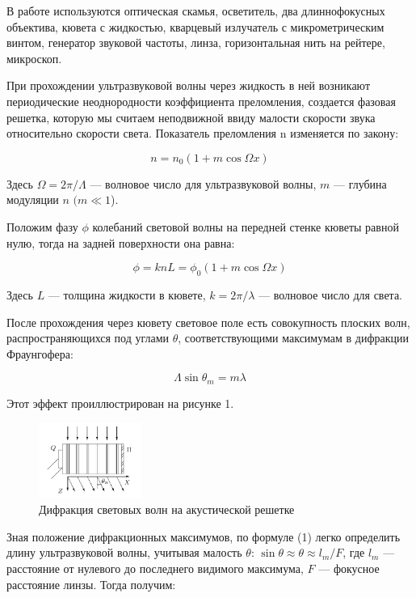 \documentclass[12pt]{kiarticle}
\begin{document}
	В работе используются оптическая скамья, осветитель, два длиннофокусных объектива, кювета с жидкостью, кварцевый излучатель с микрометрическим винтом, генератор звуковой частоты, линза, горизонтальная нить на рейтере, микроскоп. 
	
	При прохождении ультразвуковой волны через жидкость в ней возникают периодические неоднородности коэффициента преломления, создается фазовая решетка, которую мы считаем неподвижной ввиду малости скорости звука относительно скорости света. Показатель
	преломления n изменяется по закону:
	
	\begin{equation}\label{}
	n = n_0 (1 + m \cos \Omega x)
	\end{equation}
	
	Здесь $ \Omega = 2 \pi / \Lambda $ --- волновое число для ультразвуковой волны, $ m $ --- глубина модуляции $ n $ $ (m \ll 1 $).
	
	Положим фазу $ \phi $ колебаний световой волны на передней стенке кюветы равной нулю, тогда на задней поверхности она равна:
	
	\begin{equation}\label{}
	\phi  = k n L = \phi_0 (1 + m \cos \Omega x)
	\end{equation}
	
	Здесь $ L $ --- толщина жидкости в кювете, $ k = 2 \pi / \lambda $ --- волновое число для света.
	
	После прохождения через кювету световое поле есть совокупность плоских волн, распространяющихся под углами $ \theta $, соответствующими максимумам в дифракции Фраунгофера:
	
\begin{equation}\label{}	
	\Lambda \sin \theta_m = m \lambda
\end{equation}

	Этот эффект проиллюстрирован на рисунке 1.
	\begin{figure}[h!]
		\centering	
		\includegraphics[width=0.3\textwidth]{difraction.png}
		\caption{Дифракция световых волн на акустической решетке}
		\label{diff}
	\end{figure}

	Зная положение дифракционных максимумов, по формуле (1) легко определить длину ультразвуковой волны, учитывая малость $ \theta $: $ \sin \theta \approx \theta \approx l_m /F  $, где $ l_m $ --- расстояние от нулевого до последнего видимого максимума, $ F $ --- фокусное расстояние линзы. Тогда получим:
	
\end{document}
